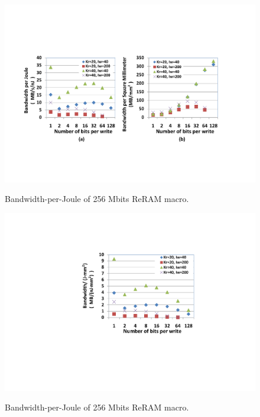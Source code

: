 \begin{figure}[!]
\centering\label{fig:BWpAE}
  \includegraphics[width=3.4 in]{./figures/BWpAE}\\
  \caption{Bandwidth-per-Joule of 256 Mbits ReRAM macro.}
  \vspace{-5pt}
\end{figure}
\begin{figure}[!]
\centering\label{fig:BWpAE2}
  \includegraphics[width=2 in]{./figures/BWpAE2}\\
  \caption{Bandwidth-per-Joule of 256 Mbits ReRAM macro.}
  \vspace{-15pt}
\end{figure}
